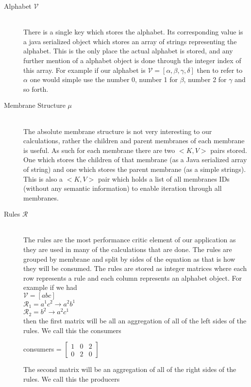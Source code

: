 \documentclass[runningheads]{llncs}
\begin{document}
\begin{description}
  \item[Alphabet $\mathcal{V}$] \hfill \\
  There is a single key which stores the alphabet. Its corresponding value is a java serialized object which stores an array of strings representing the alphabet. This is the only place the actual alphabet is stored, and any further mention of a alphabet object is done through the integer index of this array. For example if our alphabet is $\mathcal{V} = [\alpha,\beta,\gamma,\delta]$ then to refer to $\alpha$ one would simple use the number 0, number 1 for $\beta$, number 2 for $\gamma$ and so forth. 
  \item[Membrane Structure $\mu$] \hfill \\
  The absolute membrane structure is not very interesting to our calculations, rather the children and parent membranes of each membrane is useful. As such for each membrane there are two $<K,V>$ pairs stored. One which stores the children of that membrane (as a Java serialized array of string) and one which stores the parent membrane (as a simple strings). This is also a $<K,V>$ pair which holds a list of all membranes IDs (without any semantic information) to enable iteration through all membranes.  
  \item[Rules $\mathcal{R}$] \hfill \\
  The rules are the most performance critic element of our application as they are used in many of the calculations that are done. The rules are grouped by membrane and split by sides of the equation as that is how they will be consumed. The rules are stored as integer matrices where each row represents a rule and each column represents an alphabet object. For example if we had  \\[3ex]
$\mathcal{V} = [abc]$ \\ $\mathcal{R}_1 = a^1 c^2 \rightarrow a^2 b^1$ \\ $ \mathcal{R}_2 = b^2 \rightarrow a^2c^1 $ \\[3ex] then  
the first matrix will be all an aggregation of all of the left sides of the rules. We call this the consumers

consumers = $\begin{bmatrix} 1 & 0 & 2 \\  0 & 2 & 0  \end{bmatrix} $ 

The second matrix will be an aggregation of all of the right sides of the rules. We call this the producers


\end{description}
\end{document}
